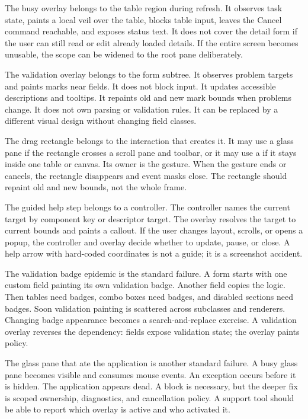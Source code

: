 The busy overlay belongs to the table region during refresh. It observes task state, paints a local veil over the table, blocks table input, leaves the Cancel command reachable, and exposes status text. It does not cover the detail form if the user can still read or edit already loaded details. If the entire screen becomes unusable, the scope can be widened to the root pane deliberately.

The validation overlay belongs to the form subtree. It observes problem targets and paints marks near fields. It does not block input. It updates accessible descriptions and tooltips. It repaints old and new mark bounds when problems change. It does not own parsing or validation rules. It can be replaced by a different visual design without changing field classes.

The drag rectangle belongs to the interaction that creates it. It may use a glass pane if the rectangle crosses a scroll pane and toolbar, or it may use a  if it stays inside one table or canvas. Its owner is the gesture. When the gesture ends or cancels, the rectangle disappears and event masks close. The rectangle should repaint old and new bounds, not the whole frame.

The guided help step belongs to a controller. The controller names the current target by component key or descriptor target. The overlay resolves the target to current bounds and paints a callout. If the user changes layout, scrolls, or opens a popup, the controller and overlay decide whether to update, pause, or close. A help arrow with hard-coded coordinates is not a guide; it is a screenshot accident.

The validation badge epidemic is the standard failure. A form starts with one custom field painting its own validation badge. Another field copies the logic. Then tables need badges, combo boxes need badges, and disabled sections need badges. Soon validation painting is scattered across subclasses and renderers. Changing badge appearance becomes a search-and-replace exercise. A validation overlay reverses the dependency: fields expose validation state; the overlay paints policy.

The glass pane that ate the application is another standard failure. A busy glass pane becomes visible and consumes mouse events. An exception occurs before it is hidden. The application appears dead. A  block is necessary, but the deeper fix is scoped ownership, diagnostics, and cancellation policy. A support tool should be able to report which overlay is active and who activated it.

